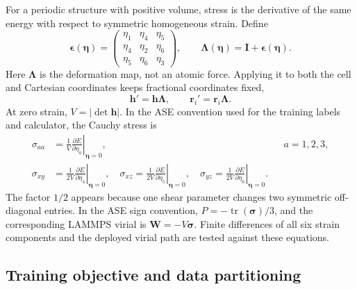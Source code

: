 \documentclass[aps,prx,preprint,notitlepage,superscriptaddress,nofootinbib,floatfix]{revtex4-2}
\newcommand{\vect}[1]{\bm{#1}}
\begin{document}
For a periodic structure with positive volume, stress is the
derivative of the same energy with respect to symmetric homogeneous strain.
Define
\begin{equation}
 \vect\epsilon(\vect\eta)=
 \begin{pmatrix}
 \eta_1&\eta_4&\eta_5\\
 \eta_4&\eta_2&\eta_6\\
 \eta_5&\eta_6&\eta_3
 \end{pmatrix},\qquad
 \vect\Lambda(\vect\eta)=\vect I+\vect\epsilon(\vect\eta).
 \label{eq:strain}
\end{equation}
Here $\vect\Lambda$ is the deformation map, not an atomic force. Applying it to both the cell and Cartesian coordinates keeps fractional coordinates fixed,
\begin{equation}
 \vect h'=\vect h\vect\Lambda,\qquad
 \vect r_i'=\vect r_i\vect\Lambda.
 \label{eq:strain-deformation}
\end{equation}
At zero strain, $V=|\det\vect h|$. In the ASE convention used
for the training labels and calculator, the Cauchy stress is
\begin{align}
 \sigma_{aa}&=\left.\frac{1}{V}\frac{\partial E}{\partial\eta_a}
 \right|_{\vect\eta=0},
 &&a=1,2,3,\\
 \sigma_{xy}&=\left.\frac{1}{2V}\frac{\partial E}{\partial\eta_4}
 \right|_{\vect\eta=0},\quad
 \sigma_{xz}=\left.\frac{1}{2V}\frac{\partial E}{\partial\eta_5}
 \right|_{\vect\eta=0},\quad
 \sigma_{yz}=\left.\frac{1}{2V}\frac{\partial E}{\partial\eta_6}
 \right|_{\vect\eta=0}.
 \label{eq:stress}
\end{align}
The factor $1/2$ appears because one shear parameter changes
two symmetric off-diagonal entries. In the ASE sign convention,
$P=-\operatorname{tr}(\vect\sigma)/3$, and the corresponding LAMMPS virial is
$\vect W=-V\vect\sigma$. Finite differences of all six strain components and
the deployed virial path are tested against these equations.

\subsection{Training objective and data partitioning}
\end{document}
